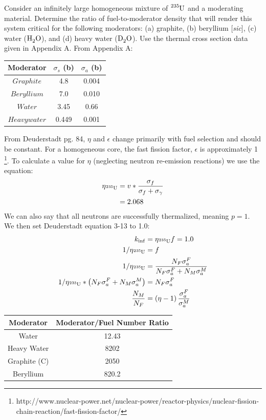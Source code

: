 \documentclass{hw}
\begin{document}
	Consider an infinitely large homogeneous mixture of $ \ce{^{235}U} $ and a moderating material. Determine the ratio of fuel-to-moderator density that will render this system critical for the following moderators: (a) graphite, (b) beryllium [\textit{sic}], (c) water ($ \ce{H_{2}O} $), and (d) heavy water ($ \ce{D_{2}O} $). Use the thermal cross section data given in Appendix A.
\solution
	From Appendix A:
	\begin{table}[h]
		\begin{tabular}{ |c|c|c| }
			\hline
			Moderator & $ \sigma_s $ (b) & $ \sigma_a $ (b) \\
			\hline
			$ Graphite $ & 4.8 & 0.004 \\
			$ Beryllium $ & 7.0 & 0.010 \\
			$ Water $ & 3.45 & 0.66 \\
			$ Heavy water $ & 0.449 & 0.001 \\
			\hline
		\end{tabular}
	\end{table}
	From Deuderstadt pg. 84, $ \eta $ and $ \epsilon $ change primarily with fuel selection and should be constant. For a homogeneous core, the fast fission factor, $ \epsilon $ is approximately 1 \footnote{http://www.nuclear-power.net/nuclear-power/reactor-physics/nuclear-fission-chain-reaction/fast-fission-factor/}. To calculate a value for $ \eta $ (neglecting neutron re-emission reactions) we use the equation:
	\begin{align*}
		\eta_{\ce{^{235}U}} &= v * \frac{\sigma_f}{\sigma_f + \sigma_{\gamma}} \\
		&= 2.068
	\end{align*}
	We can also say that all neutrons are successfully thermalized, meaning $p=1$. We then set Deuderstadt equation 3-13 to 1.0:
	\begin{align*}
		k_{\inf} &= \eta_{\ce{^{235}U}} f = 1.0 \\
		1 / \eta_{\ce{^{235}U}} &= f \\
		1 / \eta_{\ce{^{235}U}} &= \frac{N_{F} \sigma^{F}_a}{N_{F}\sigma^{F}_a + N_{M} \sigma^M_a} \\
		1 / \eta_{\ce{^{235}U}} * \left( N_{F}\sigma^{F}_a + N_{M} \sigma^M_a \right) &= N_{F} \sigma^{F}_a \\
		\frac{N_M}{N_F} &= \left( \eta - 1 \right) \frac{\sigma^F_a}{\sigma^M_a}
	\end{align*}
	\begin{table}[h]
		\begin{tabular}{ |c|c| }
			\hline
			Moderator & Moderator/Fuel Number Ratio \\
			\hline
			Water & 12.43 \\
			Heavy Water & 8202 \\
			Graphite (C) & 2050 \\
			Beryllium & 820.2 \\
			\hline
		\end{tabular}
	\end{table}
\end{document}
